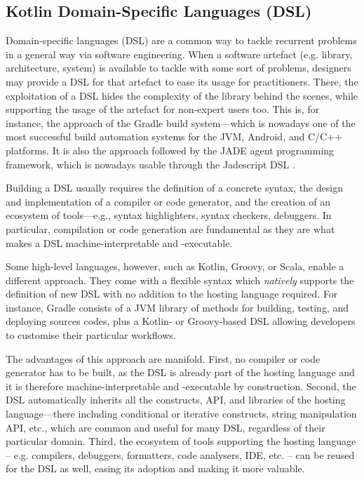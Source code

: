 \documentclass[12pt,a4paper,openright,twoside]{book}
\begin{document}
\subsection{Kotlin Domain-Specific Languages (DSL)}

Domain-specific languages (DSL) are a common way to tackle recurrent problems in a general way via software engineering.
%
When a software artefact (e.g. library, architecture, system) is available to tackle with  some sort of problems, designers may provide a DSL for that artefact to ease its usage for practitioners.
%
There, the exploitation of a DSL hides the complexity of the library behind the scenes, while supporting the usage of the artefact for non-expert users too.
%
This is, for instance, the approach of the Gradle build system\footnotemark---which is nowadays one of the most successful build automation systems for the JVM, Android, and C/C++ platforms.
%
%
It is also the approach followed by the JADE agent programming framework, which is nowadays usable through the Jadescript DSL \cite{BergentiCMP20}.

Building a DSL usually requires the definition of a concrete syntax, the design and implementation of a compiler or code generator, and the creation of an eco\-system of tools---e.g., syntax highlighters, syntax checkers, debuggers.
%
In particular, compilation or code generation are fundamental as they are what makes a DSL machine-interpretable and -executable.

Some high-level languages, however, such as Kotlin, Groovy, or Scala, enable a different approach.
%
They come with a flexible syntax which \emph{natively} supports the definition of new DSL with no addition to the hosting language required.
%
For instance, Gradle consists of a JVM library of methods for building, testing, and deploying sources codes, plus a Kotlin- or Groovy-based DSL allowing developers to customise their particular workflows.

The advantages of this approach are manifold.
%
First, no compiler or code generator has to be built, as the DSL is already part of the hosting language and it is therefore machine-interpretable and -executable by construction.
%
Second, the DSL automatically inherits all the constructs, API, and libraries of the hosting lan\-gua\-ge---there including conditional or iterative con\-stru\-cts, string manipulation API, etc., which are common and useful for many DSL, regardless of their particular domain.
%
Third, the ecosystem of tools supporting the hosting language -- e.g. compilers, debuggers, formatters, code analysers, IDE, etc. -- can be reused for the DSL as well, easing its adoption and making it more valuable.
\end{document}
